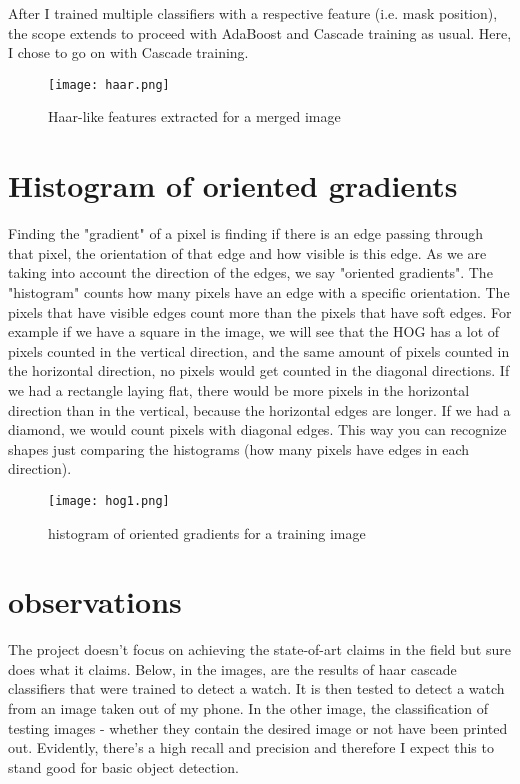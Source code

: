 \documentclass[%
 aip,
 jmp,%
 amsmath,amssymb,
 reprint,%
]{revtex4-1}
\begin{document}
After I trained multiple classifiers with a respective feature (i.e. mask position), the scope extends to proceed with AdaBoost and Cascade training as usual. Here, I chose to go on with Cascade training. 

\begin{figure}[h]
\texttt{[image: haar.png]}
\caption{Haar-like features extracted for a merged image}
\label{fig:haar}
\end{figure}
\FloatBarrier


\section{Histogram of oriented gradients}

Finding the "gradient" of a pixel is finding if there is an edge passing through that pixel, the orientation of that edge and how visible is this edge. As we are taking into account the direction of the edges, we say "oriented gradients". The "histogram" counts how many pixels have an edge with a specific orientation. The pixels that have visible edges count more than the pixels that have soft edges. For example if we have a square in the image, we will see that the HOG has a lot of pixels counted in the vertical direction, and the same amount of pixels counted in the horizontal direction, no pixels would get counted in the diagonal directions. If we had a rectangle laying flat, there would be more pixels in the horizontal direction than in the vertical, because the horizontal edges are longer. If we had a diamond, we would count pixels with diagonal edges. This way you can recognize shapes just comparing the histograms (how many pixels have edges in each direction).

\begin{figure}[h]
\texttt{[image: hog1.png]}
\caption{histogram of oriented gradients for a training image}
\label{fig:hog}
\end{figure}
\FloatBarrier

\section{observations}

The project doesn't focus on achieving the state-of-art claims in the field but sure does what it claims. Below, in the images, are the results of haar cascade classifiers that were trained to detect a watch. It is then tested to detect a watch from an image taken out of my phone. In the other image, the classification of testing images - whether they contain the desired image or not have been printed out. Evidently, there's a high recall and precision and therefore I expect this to stand good for basic object detection. 
\end{document}
